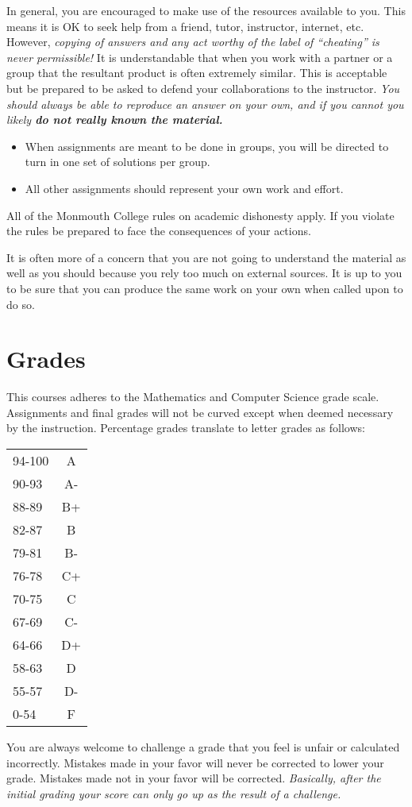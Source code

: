 \documentclass[10pt]{article}
\begin{document}
In general, you are encouraged to make use of the resources available to you.  This means it is OK to seek help from a friend, tutor, instructor, internet, etc.  However, \textit{copying of answers and any act worthy of the label of ``cheating'' is never permissible!}  It is understandable that when you work with a partner or a group that the resultant product is often extremely similar.  This is acceptable but be prepared to be asked to defend your collaborations to the instructor.  \textit{You should always be able to reproduce an answer on your own, and if you cannot you likely \textbf{do not really known the material.}} 
\begin{itemize}
\item When assignments are meant to be done in groups, you will be directed to turn in one set of solutions per group.
\item All other assignments should represent your own work and effort.
\end{itemize}
All of the Monmouth College rules on academic dishonesty apply.  If you violate the rules be prepared to face the consequences of your actions.  

It is often more of a concern that you are not going to understand the material as well as you should because you rely too much on external sources.  It is up to you to be sure that you can produce the same work on your own when called upon to do so.  


\section{Grades}

This courses adheres to the Mathematics and Computer Science grade scale.  Assignments and final grades will not be curved except when deemed necessary by the instruction.  Percentage grades translate to letter grades as follows:
\newline
\begin{small}
\begin{tabular}{lc}
94-100 & A \\
90-93 & A- \\
88-89 & B+ \\
82-87 & B \\
79-81 & B- \\
76-78 & C+ \\
70-75 & C \\
67-69 & C- \\
64-66 & D+ \\
58-63 & D \\
55-57 & D- \\
0-54 & F 
\end{tabular}
\end{small}
\newline
You are always welcome to challenge a grade that you feel is unfair or calculated incorrectly.  Mistakes made in your favor will never be corrected to lower your grade.  Mistakes made not in your favor will be corrected.  \textit{Basically, after the initial grading your score can only go up as the result of a challenge.}
\end{document}
